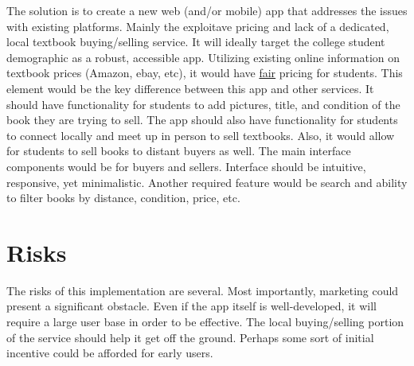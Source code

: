 \documentclass[12pt]{article}
\begin{document}
	The solution is to create a new web (and/or mobile) app that addresses the issues with existing platforms. Mainly the
	exploitave pricing and lack of a dedicated, local textbook buying/selling service.
	It will ideally target the college student demographic as a robust, accessible app. Utilizing existing online
        information on textbook prices (Amazon, ebay, etc), it would have \underline{fair} pricing for students. This element would be the
	key difference between this app and other services.
	It should have functionality for students to add pictures, title, and condition of the book they are trying to sell.
	The app should also have functionality for students to connect locally and meet up in person to sell textbooks.
        Also, it would allow for students to sell books to distant buyers as well.
	The main interface components would be for buyers and sellers. Interface should be intuitive, responsive,
        yet minimalistic. Another required feature would be search and ability to filter books by distance, condition, price, etc.


	\section{Risks}
	The risks of this implementation are several. Most importantly, marketing could present a significant obstacle.
        Even if the app itself is well-developed, it will require a large user base in order to be effective. The local
	buying/selling portion of the service should help it get off the ground.	
	Perhaps some sort of initial incentive could be afforded for early users. 




\end{document}
